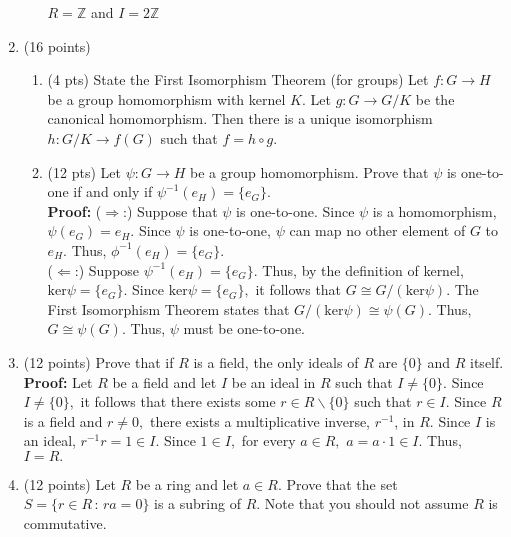 \documentclass[12pt]{article}
\newcommand{\bbZ}{\mathbb{Z}}
\begin{document}
\begin{enumerate}
\begin{enumerate}
	$R=\bbZ$ and $I=2\bbZ$\\
	\vfill
	\end{enumerate}
\item (16 points) 
	\begin{enumerate}
	\item (4 pts) State the First Isomorphism Theorem (for groups)
	Let $f: G \to H$ be a group homomorphism with kernel $K.$ Let $g:G \to G/K$ be the canonical homomorphism. Then there is a unique isomorphism $h: G/K \to f(G)$ such that $f=h \circ g.$\\
	\item (12 pts) Let $\psi: G \to H$ be a group homomorphism. Prove that $\psi$ is one-to-one if and only if $\psi^{-1}(e_H)=\{e_G\}.$\\	
	
	\textbf{Proof:} ($\Longrightarrow$:) Suppose that $\psi$ is one-to-one. Since $\psi$ is a homomorphism, $\psi(e_G)=e_H.$ Since $\psi$ is one-to-one, $\psi$ can map no other element of $G$ to $e_H.$ Thus, $\phi^{-1}(e_H)=\{e_G\}.$\\
	
	($\Longleftarrow$:) Suppose $\psi^{-1}(e_H)=\{e_G\}.$ Thus, by the definition of kernel, $\text{ker} \psi = \{e_G\}.$ Since $\text{ker} \psi = \{e_G\},$ it follows that $G \cong G/(\text{ker} \psi ).$ The First Isomorphism Theorem states that $G/(\text{ker} \psi ) \cong \psi(G).$ Thus, $G \cong \psi(G).$ Thus, $\psi$ must be one-to-one.\\
	\end{enumerate}
\item (12 points) Prove that if $R$ is a field, the only ideals of $R$ are $\{0\}$ and $R$ itself.\\

\textbf{Proof:} Let $R$ be a field and let $I$ be an ideal in $R$ such that $I \not = \{0\}.$ Since $I \not =\{0\},$ it follows that there exists some $r \in R \backslash \{0\}$ such that $r \in I.$ Since $R$ is a field and $r \not=0,$ there exists a multiplicative inverse, $r^{-1}$, in $R.$ Since $I$ is an ideal, $r^{-1}r=1 \in I.$ Since $1 \in I,$ for every $a \in R,$ $a=a\cdot 1 \in I.$ Thus, $I=R.$
\vfill

%
\item (12 points) Let $R$ be a ring and let $a \in R.$ Prove that the set $S=\{r \in R \, : \, ra=0\}$ is a subring of $R.$ Note that you should not assume $R$ is commutative.\\


\end{enumerate}
\end{document}
